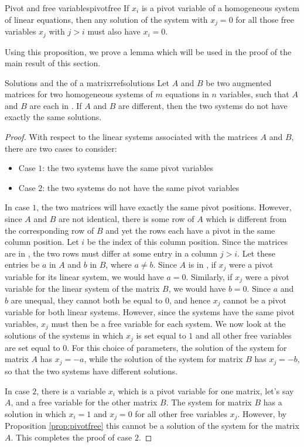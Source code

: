 \begin{proposition}{Pivot and free variables}{pivotfree}
  If $x_i$ is a pivot variable of a homogeneous system of linear
  equations, then any solution of the system with $x_j=0$ for all
  those free variables $x_j$ with $j>i$ must also have $x_i=0$.
\end{proposition}

Using this proposition, we prove a lemma which will be used in the
proof of the main result of this section.

\begin{lemma}{Solutions and the {\rref} of a matrix}{rrefsolutions}
  Let $A$ and $B$ be two augmented matrices for two homogeneous
  systems of $m$ equations in $n$ variables, such that $A$ and $B$ are
  each in {\rref}. If $A$ and $B$ are different, then the two systems
  do not have exactly the same solutions.
\end{lemma}

\begin{proof}
With respect to the linear systems associated with the matrices $A$ and $B$, there are two cases to consider:
\begin{itemize}
\item Case $1$: the two systems have the same pivot variables
\item Case $2$: the two systems do not have the same pivot variables
\end{itemize}
In case $1$, the two matrices will have exactly the same pivot positions. However, since $A$ and $B$ are not identical, there is some row of $A$ which is different from the corresponding row of $B$ and yet the rows each have a pivot in the same column position. Let $i$ be the index of this column position. Since the matrices are in {\rref}, the two rows must differ at some entry in a column $j>i$. Let these entries be $a$ in $A$ and $b$ in $B$, where $a \neq b$. Since $A$ is in {\rref}, if $x_j$ were a pivot variable for its linear system, we would have $a=0$. Similarly, if $x_j$ were a pivot variable for the linear system of the matrix $B$, we would have $b=0$. Since $a$ and $b$ are unequal, they cannot both be equal to $0$, and hence $x_j$ cannot be a pivot variable for both linear systems. However, since the systems have the same pivot variables, $x_j$ must then be a free variable for each system. We now look at the solutions of the systems in which $x_j$ is set equal to $1$ and all other free variables are set equal to $0$. For this choice of parameters, the solution of the system for matrix $A$ has $x_j=-a$, while the solution of the system for matrix $B$ has $x_j=-b$, so that the two systems have different solutions.

In case $2$, there is a variable $x_i$ which is a pivot variable for one matrix, let's say $A$, and a free variable for the other matrix $B$. The system for matrix $B$ has a solution in which $x_i=1$ and $x_j=0$ for all other free variables $x_j$. However, by Proposition \ref{prop:pivotfree} this cannot be a solution of the system for the matrix $A$. This completes the proof of case $2$.
\end{proof}

